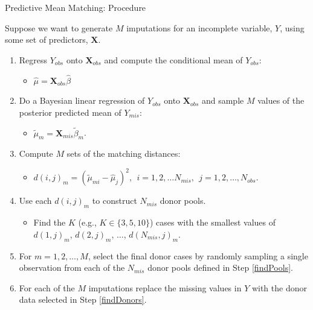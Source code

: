 \documentclass{beamer}\usepackage[]{graphicx}\usepackage[]{color}
\begin{document}
\begin{frame}[allowframebreaks]{Predictive Mean Matching: Procedure}
  
  Suppose we want to generate $M$ imputations for an incomplete variable, $Y$, 
  using some set of predictors, $\mathbf{X}$.
  \vc
  \begin{enumerate}
  \item Regress $Y_{obs}$ onto $\mathbf{X}_{obs}$ and compute the conditional mean 
    of $Y_{obs}$: 
    \begin{itemize}
    \item $\hat{\mu} = \mathbf{X}_{obs} \hat{\beta}$
    \end{itemize}
    \vc
  \item Do a Bayesian linear regression of $Y_{obs}$ onto $\mathbf{X}_{obs}$ and 
    sample $M$ values of the posterior predicted mean of $Y_{mis}$: 
    \begin{itemize}
    \item $\tilde{\mu}_m = \mathbf{X}_{mis} \tilde{\beta}_m$.
    \end{itemize}
    \vc
  \item Compute $M$ sets of the matching distances: 
    \begin{itemize}
    \item $d(i, j)_m = (\tilde{\mu}_{mi} - \hat{\mu}_j)^2,~~i = 1, 2, \ldots N_{mis},~~j = 1, 2, \ldots, N_{obs}.$
    \end{itemize}
    
    \pagebreak
    
  \item Use each $d(i, j)_m$ to construct $N_{mis}$ donor pools. \label{findPools}
    \begin{itemize} 
    \item Find the $K$ (e.g., $K \in \{3, 5, 10\}$) cases with the smallest 
      values of $d(1, j)_m$, $d(2, j)_m$, $\ldots$, $d(N_{mis}, j)_m$. 
    \end{itemize}
    \vc
  \item For $m = 1, 2, \ldots, M$, select the final donor cases by randomly 
    sampling a single observation from each of the $N_{mis}$ donor pools defined 
    in Step \ref{findPools}. \label{findDonors}
    \vc
  \item For each of the $M$ imputations replace the missing values in $Y$ with 
    the donor data selected in Step \ref{findDonors}.
  \end{enumerate}
  
\end{frame}
\end{document}
